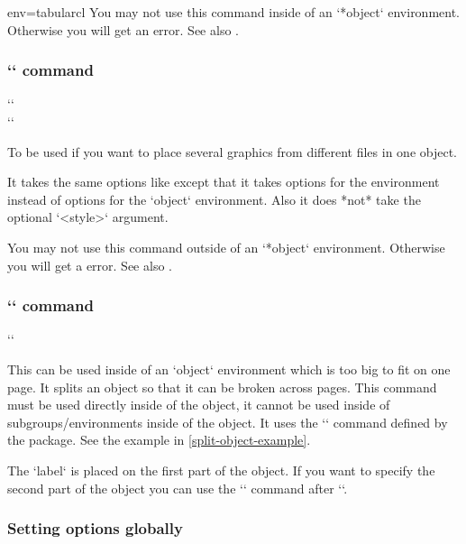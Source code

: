 \begin{tableobject}{env=tabular}{cl}
You may not use this command inside of an `*object` environment.
Otherwise you will get an  error.
See also .
\endgroup

\subsubsection{`` command}
\label{includegraphicsubobject-command}
`` \\
``

To be used if you want to place several graphics from different files in one object.

It takes the same options like  except that it takes options for the  environment instead of options for the `object` environment.
Also it does *not* take the optional `<style>` argument.

You may not use this command outside of an `*object` environment.
Otherwise you will get a  error.
See also .


\subsubsection{`\splitobject` command}
\label{splitobject-command}
\DescribeMacro{\splitobject}
`\splitobject`

This can be used inside of an `object` environment which is too big to fit on one page.
It splits an object so that it can be broken across pages.
This command must be used directly inside of the object,
it cannot be used inside of subgroups/environments inside of the object.
It uses the `\ContinuedFloat` command defined by the  package.
See the example in \cref{split-object-example}.

The `label` is placed on the first part of the object.
If you want to specify the second part of the object you can use the `\label{<second-label>}` command after `\splitobject`.


\subsubsection{Setting options globally}
\label{setting-options-globally}


\end{tableobject}
